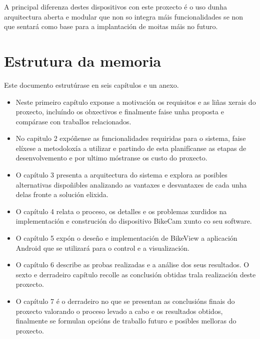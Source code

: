  A principal diferenza destes dispositivos con este proxecto é o uso dunha arquitectura aberta e modular que non so integra máis funcionalidades se non que sentará como base para a implantación de moitas máis no futuro.


\section{Estrutura da memoria}
Este documento estrutúrase en seis capítulos e un anexo.
\begin{itemize}
  \item Neste primeiro capítulo exponse a motivación os requisitos e as liñas xerais do proxecto, incluíndo os obxectivos e finalmente faise unha proposta e compárase con traballos relacionados.
  \item No capitulo 2 expóñense as funcionalidades requiridas para o sistema, faise elíxese a metodoloxía a utilizar e partindo de esta planifícanse as etapas de desenvolvemento e por ultimo móstranse os custo do proxecto.
  \item O capítulo 3 presenta a arquitectura do sistema e explora as posibles alternativas dispoñibles analizando as vantaxes e desvantaxes de cada unha delas fronte a solución elixida.
  \item O capítulo 4 relata o proceso, os detalles e os problemas xurdidos na implementación e construción do dispositivo BikeCam xunto co seu software.
  \item O capítulo 5 expón o deseño e implementación de BikeView a aplicación Android que se utilizará para o control e a visualización.
  \item O capítulo 6 describe as probas realizadas e a análise dos seus resultados. O sexto e derradeiro capítulo recolle as conclusión obtidas trala realización deste proxecto.
  \item O capítulo 7 é o derradeiro no que se presentan as conclusións finais do proxecto valorando o proceso levado a cabo e os resultados obtidos, finalmente se formulan opcións de traballo futuro e posibles melloras do proxecto.
\end{itemize}
